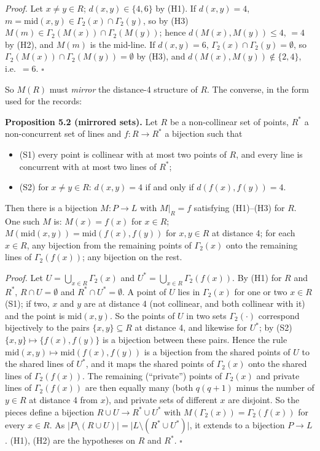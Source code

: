 \documentclass[
  11pt,
]{article}
\providecommand{\tightlist}{%
  \setlength{\itemsep}{0pt}\setlength{\parskip}{0pt}}
\begin{document}
\emph{Proof.} Let \(x\ne y\in R\); \(d(x,y)\in\{4,6\}\) by (H1). If \(d(x,y) = 4\),
\(m = \mathrm{mid}(x,y)\in\Gamma_2(x)\cap\Gamma_2(y)\), so by (H3) \(M(m)\in\Gamma_2(M(x))\cap\Gamma_2(M(y))\); hence
\(d(M(x),M(y))\le 4\), \(=4\) by (H2), and \(M(m)\) is the mid-line. If \(d(x,y) = 6\),
\(\Gamma_2(x)\cap\Gamma_2(y) = \emptyset\), so \(\Gamma_2(M(x))\cap\Gamma_2(M(y)) = \emptyset\) by (H3), and
\(d(M(x),M(y))\notin\{2,4\}\), i.e.~\(= 6\). \(\square\)

So \(M(R)\) must \emph{mirror} the distance-4 structure of \(R\). The converse, in the form used for the records:

\textbf{Proposition 5.2 (mirrored sets).} Let \(R\) be a non-collinear set of points, \(R^*\) a non-concurrent set of
lines and \(f: R\to R^*\) a bijection such that

\begin{itemize}
\tightlist
\item
  (S1) every point is collinear with at most two points of \(R\), and every line is concurrent with at most two lines of
  \(R^*\);
\item
  (S2) for \(x\ne y\in R\): \(d(x,y) = 4\) if and only if \(d(f(x),f(y)) = 4\).
\end{itemize}

Then there is a bijection \(M: P\to L\) with \(M\vert_R = f\) satisfying (H1)--(H3) for \(R\). One such \(M\) is:
\(M(x) = f(x)\) for \(x\in R\); \(M(\mathrm{mid}(x,y)) = \mathrm{mid}(f(x),f(y))\) for \(x,y\in R\) at distance 4; for
each \(x\in R\), any bijection from the remaining points of \(\Gamma_2(x)\) onto the remaining lines of
\(\Gamma_2(f(x))\); any bijection on the rest.

\emph{Proof.} Let \(U = \bigcup_{x\in R}\Gamma_2(x)\) and \(U^* = \bigcup_{x\in R}\Gamma_2(f(x))\). By (H1) for \(R\)
and \(R^*\), \(R\cap U = \emptyset\) and \(R^*\cap U^* = \emptyset\). A point of \(U\) lies in \(\Gamma_2(x)\) for one
or two \(x\in R\) (S1); if two, \(x\) and \(y\) are at distance 4 (not collinear, and both collinear with it) and the
point is \(\mathrm{mid}(x,y)\). So the points of \(U\) in two sets \(\Gamma_2(\cdot)\) correspond bijectively to the
pairs \(\{x,y\}\subseteq R\) at distance 4, and likewise for \(U^*\); by (S2) \(\{x,y\}\mapsto\{f(x),f(y)\}\) is a
bijection between these pairs. Hence the rule \(\mathrm{mid}(x,y)\mapsto\mathrm{mid}(f(x),f(y))\) is a bijection from
the shared points of \(U\) to the shared lines of \(U^*\), and it maps the shared points of \(\Gamma_2(x)\) onto the
shared lines of \(\Gamma_2(f(x))\). The remaining (``private'') points of \(\Gamma_2(x)\) and private lines of
\(\Gamma_2(f(x))\) are then equally many (both \(q(q+1)\) minus the number of \(y\in R\) at distance 4 from \(x\)), and
private sets of different \(x\) are disjoint. So the pieces define a bijection \(R\cup U\to R^*\cup U^*\) with
\(M(\Gamma_2(x)) = \Gamma_2(f(x))\) for every \(x\in R\). As
\(\lvert P\setminus (R\cup U)\rvert = \lvert L\setminus(R^*\cup U^*)\rvert\), it extends to a bijection \(P\to L\).
(H1), (H2) are the hypotheses on \(R\) and \(R^*\). \(\square\)
\end{document}
